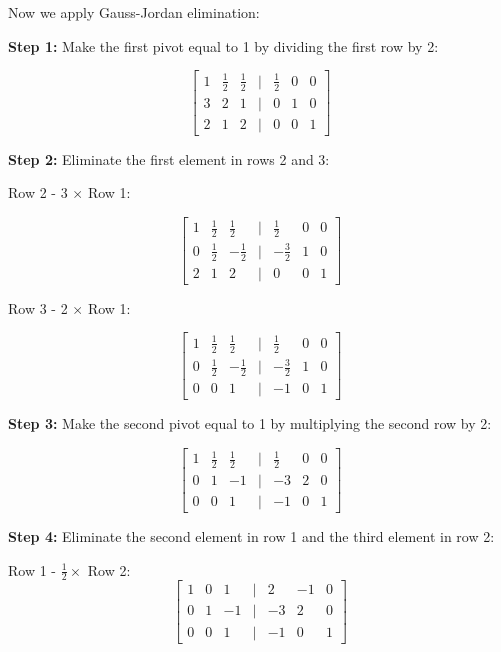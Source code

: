 Now we apply Gauss-Jordan elimination:

\textbf{Step 1:} Make the first pivot equal to 1 by dividing the first row by 2:

\[
    \begin{bmatrix}
    1 & \frac{1}{2} & \frac{1}{2} & | & \frac{1}{2} & 0 & 0 \\
    3 & 2 & 1 & | & 0 & 1 & 0 \\
    2 & 1 & 2 & | & 0 & 0 & 1
    \end{bmatrix}
\]

\textbf{Step 2:} Eliminate the first element in rows 2 and 3:

Row 2 - 3 \(\times\) Row 1:

\[
    \begin{bmatrix}
    1 & \frac{1}{2} & \frac{1}{2} & | & \frac{1}{2} & 0 & 0 \\
    0 & \frac{1}{2} & -\frac{1}{2} & | & -\frac{3}{2} & 1 & 0 \\
    2 & 1 & 2 & | & 0 & 0 & 1
    \end{bmatrix}
\]

Row 3 - 2 \(\times\) Row 1:

\[
    \begin{bmatrix}
    1 & \frac{1}{2} & \frac{1}{2} & | & \frac{1}{2} & 0 & 0 \\
    0 & \frac{1}{2} & -\frac{1}{2} & | & -\frac{3}{2} & 1 & 0 \\
    0 & 0 & 1 & | & -1 & 0 & 1
    \end{bmatrix}
\]

\textbf{Step 3:} Make the second pivot equal to 1 by multiplying the second row by 2:

\[
    \begin{bmatrix}
    1 & \frac{1}{2} & \frac{1}{2} & | & \frac{1}{2} & 0 & 0 \\
    0 & 1 & -1 & | & -3 & 2 & 0 \\
    0 & 0 & 1 & | & -1 & 0 & 1
    \end{bmatrix}
\]

\textbf{Step 4:} Eliminate the second element in row 1 and the third element in row 2:

Row 1 - \(\frac{1}{2} \times\) Row 2:
\[
    \begin{bmatrix}
    1 & 0 & 1 & | & 2 & -1 & 0 \\
    0 & 1 & -1 & | & -3 & 2 & 0 \\
    0 & 0 & 1 & | & -1 & 0 & 1
    \end{bmatrix}
\]

